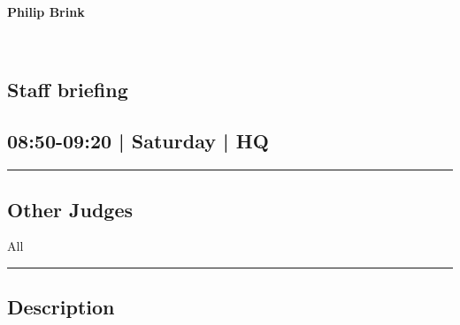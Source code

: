 \documentclass[10pt, A5]{article}
\newcommand{\newtitle}[1]{\begin{center}{\Huge\bfseries #1 }\\ \vspace{5mm}\end{center}}
\newcommand{\newsubtitle}[1]{\begin{center}{\color{grey}\Large\bfseries #1 }\\ \vspace{5mm}\end{center}}
\begin{document}
		\newtitle{Philip Brink}
	\newsubtitle{}



    
	
	

		\begin{framed}
			\begin{minipage}{\textwidth}

			\setcounter{section}{13}
							\section{Staff briefing}
						
			\subsection*{08:50-09:20 | Saturday | HQ}

			\vspace{0.25cm}
			\hrule
			\vspace{0.25cm}


			\subsection*{Other Judges}
							All

					\vspace{0.25cm}
			\hrule
			\vspace{0.25cm}

			\begin{minipage}{\textwidth}
			\subsection*{\faListAlt \: Description}
			
			\end{minipage}


	\end{minipage}
	\end{framed}

	
\end{document}
